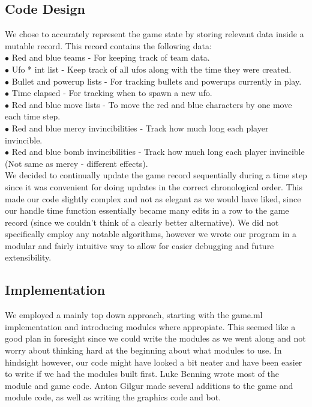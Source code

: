 \documentclass{article}
\begin{document}
\subsection{Code Design}
We chose to accurately represent the game state by storing relevant data inside a mutable record. This record contains the following data: \\
$\bullet$ Red and blue teams - For keeping track of team data. \\
$\bullet$ Ufo * int list - Keep track of all ufos along with the time they were created. \\
$\bullet$ Bullet and powerup lists - For tracking bullets and powerups currently in play. \\
$\bullet$ Time elapsed - For tracking when to spawn a new ufo. \\
$\bullet$ Red and blue move lists - To move the red and blue characters by one move each time step. \\
$\bullet$ Red and blue mercy invincibilities - Track how much long each player invincible. \\
$\bullet$ Red and blue bomb invincibilities - Track how much long each player invincible (Not same as mercy - different effects). \\

We decided to continually update the game record sequentially during a time step since it was convenient for doing updates in the correct chronological order. This made our code slightly complex and not as elegant as we would have liked, since our handle time function essentially became many edits in a row to the game record (since we couldn't think of a clearly better alternative). We did not specifically employ any notable algorithms, however we wrote our program in a modular and fairly intuitive way to allow for easier debugging and future extensibility. 

\subsection{Implementation}
We employed a mainly top down approach, starting with the game.ml implementation and introducing modules where appropiate. This seemed like a good plan in foresight since we could write the modules as we went along and not worry about thinking hard at the beginning about what modules to use. In hindsight however, our code might have looked a bit neater and have been easier to write if we had the modules built first. Luke Benning wrote most of the module and game code. Anton Gilgur made several additions to the game and module code, as well as writing the graphics code and bot.
\end{document}
